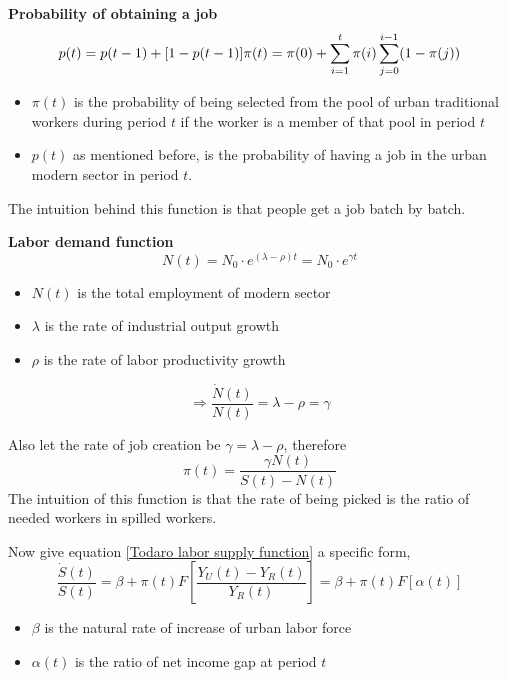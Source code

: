 \documentclass{article}
\numberwithin{equation}{section} %
\begin{document}
\textbf{Probability of obtaining a job}
\begin{equation}
  p(t)=p(t-1)+[1-p(t-1)]\pi(t)\\
  =\pi(0)+\sum\limits_{i=1}^{t}\pi(i) \sum\limits_{j=0}^{i-1}(1-\pi(j))
\end{equation}

\begin{itemize}
  \item $\pi(t)$ is the probability of being selected from the pool of urban traditional workers during period $t$ if the worker is a member of that pool in period $t$
  \item $p(t)$ as mentioned before, is the probability of having a job in the urban modern sector in period $t$.
\end{itemize}
The intuition behind this function is that people get a job batch by batch.

\textbf{Labor demand function}
\begin{equation}
  N(t)=N_0 \cdot e^{(\lambda-\rho)t} = N_0 \cdot e^{\gamma t}
\end{equation}
\begin{itemize}
  \item $N(t)$ is the total employment of modern sector
  \item $\lambda$ is the rate of industrial output growth
  \item $\rho$ is the rate of labor productivity growth
\end{itemize}

\begin{equation}
  \Rightarrow \frac{\dot N(t)}{N(t)}=\lambda-\rho=\gamma 
  \label{N(t)'s time derivative}
\end{equation}

Also let the rate of job creation be $\gamma = \lambda-\rho$, therefore
\begin{equation}
  \pi(t)=\frac{\gamma N(t)}{S(t)-N(t)}
  \label{meaningful picking prob}
\end{equation}
The intuition of this function is that the rate of being picked is the ratio of needed workers in spilled workers.

Now give equation \ref{Todaro labor supply function} a specific form,
\begin{equation}
  \frac{\dot S(t)}{S(t)}=\beta+\pi(t)F[\frac{Y_U(t)-Y_R(t)}{Y_R(t)}]=\beta+\pi(t) F[\alpha(t)]
  \label{specified Todaro labor supply}
\end{equation}
\begin{itemize}
  \item $\beta$ is the natural rate of increase of urban labor force
  \item $\alpha(t)$ is the ratio of net income gap at period $t$
\end{itemize}
\end{document}
